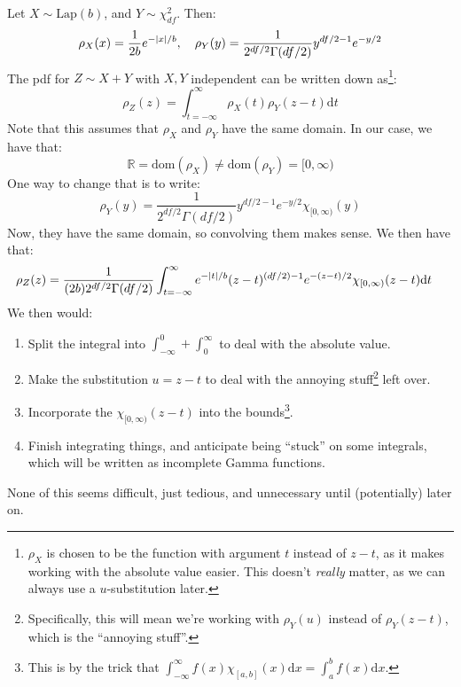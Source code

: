 \documentclass{article}
\begin{document}
Let $X\sim\text{Lap}(b)$, and $Y\sim\chi^2_{df}$.
Then:
\begin{equation}
\rho_X(x) = \frac{1}{2b}e^{-\abs{x}/b},\quad \rho_Y(y) = \frac{1}{2^{df/2}\Gamma(df/2)}y^{df/2-1}e^{-y/2}
\end{equation}
The pdf for $Z\sim X+Y$ with $X,Y$ independent can be written down as\footnote{$\rho_X$ is chosen to be the function with argument $t$ instead of $z - t$, as it makes working with the absolute value easier.
This doesn't \emph{really} matter, as we can always use a $u$-substitution later.}:
\begin{equation}
\rho_Z(z) = \int_{t = -\infty}^\infty \rho_X(t)\rho_Y(z-t)\mathrm{d}t
\end{equation}
Note that this assumes that $\rho_X$ and $\rho_Y$ have the same domain.
In our case, we have that:
\begin{equation}
\mathbb{R} = \text{dom}(\rho_X) \neq \text{dom}(\rho_Y) = [0,\infty)
\end{equation}
One way to change that is to write:
\begin{equation}
\rho_Y(y) = \frac{1}{2^{df/2}\Gamma(df/2)}y^{df/2-1}e^{-y/2}\chi_{[0,\infty)}(y)
\end{equation}
Now, they have the same domain, so convolving them makes sense.
We then have that:
\begin{align*}
\rho_Z(z) &= \frac{1}{(2b)2^{df/2}\Gamma(df/2)}\int_{t = -\infty}^\infty e^{-\abs{t}/b} (z-t)^{(df/2)-1}e^{-(z-t)/2}\chi_{[0,\infty)}(z-t)\mathrm{d}t
\end{align*}
We then would:
\begin{enumerate}
\item Split the integral into $\int_{-\infty}^0 + \int_0^\infty$ to deal with the absolute value.
\item Make the substitution $u = z-t$ to deal with the annoying stuff\footnote{Specifically, this will mean we're working with $\rho_Y(u)$ instead of $\rho_Y(z-t)$, which is the ``annoying stuff''.} left over.
\item Incorporate the $\chi_{[0,\infty)}(z-t)$ into the bounds\footnote{This is by the trick that $\int_{-\infty}^\infty f(x)\chi_{[a,b]}(x)\mathrm{d}x = \int_a^b f(x)\mathrm{d}x$.}.
\item Finish integrating things, and anticipate being ``stuck'' on some integrals, which will be written as incomplete Gamma functions.
\end{enumerate}
None of this seems difficult, just tedious, and unnecessary until (potentially) later on.
\end{document}

